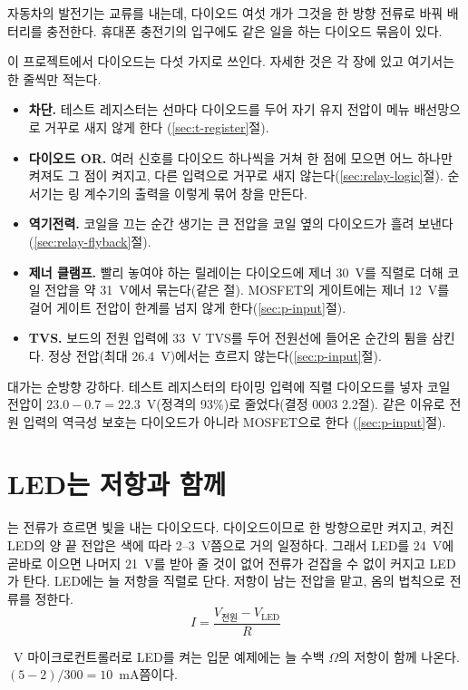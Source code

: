 \General 자동차의 발전기는 교류를 내는데, 다이오드 여섯 개가 그것을 한 방향 전류로 바꿔 배터리를 충전한다. 휴대폰
충전기의 입구에도 같은 일을 하는 다이오드 묶음이 있다.

\Ours 이 프로젝트에서 다이오드는 다섯 가지로 쓰인다. 자세한 것은 각 장에 있고 여기서는 한 줄씩만 적는다.
\begin{itemize}
\item \textbf{차단.} 테스트 레지스터는 선마다 다이오드를 두어 자기 유지 전압이 메뉴 배선망으로 거꾸로 새지 않게 한다
(\ref{sec:t-register}절).
\item \textbf{다이오드 OR.} 여러 신호를 다이오드 하나씩을 거쳐 한 점에 모으면 어느 하나만 켜져도 그 점이 켜지고,
다른 입력으로 거꾸로 새지 않는다(\ref{sec:relay-logic}절). 순서기는 링 계수기의 출력을 이렇게 묶어 창을 만든다.
\item \textbf{역기전력.} 코일을 끄는 순간 생기는 큰 전압을 코일 옆의 다이오드가 흘려 보낸다(\ref{sec:relay-flyback}절).
\item \textbf{제너 클램프.} 빨리 놓여야 하는 릴레이는 다이오드에 제너 30~V를 직렬로 더해 코일 전압을 약 31~V에서
묶는다(같은 절). MOSFET의 게이트에는 제너 12~V를 걸어 게이트 전압이 한계를 넘지 않게 한다(\ref{sec:p-input}절).
\item \textbf{TVS.} 보드의 전원 입력에 33~V TVS를 두어 전원선에 들어온 순간의 튐을 삼킨다. 정상 전압(최대 26.4~V)에서는
흐르지 않는다(\ref{sec:p-input}절).
\end{itemize}
대가는 순방향 강하다. 테스트 레지스터의 타이밍 입력에 직렬 다이오드를 넣자 코일 전압이 $23.0 - 0.7 = 22.3$~V(정격의
93\%)로 줄었다(결정 0003 2.2절). 같은 이유로 전원 입력의 역극성 보호는 다이오드가 아니라 MOSFET으로 한다
(\ref{sec:p-input}절).

\section{LED는 저항과 함께}\label{sec:el-led}

\Why {}는 전류가 흐르면 빛을 내는 다이오드다. 다이오드이므로 한 방향으로만 켜지고, 켜진
LED의 양 끝 전압은 색에 따라 2--3~V쯤으로 거의 일정하다. 그래서 LED를 24~V에 곧바로 이으면 나머지 21~V를 받아 줄
것이 없어 전류가 걷잡을 수 없이 커지고 LED가 탄다. LED에는 늘 저항을 직렬로 단다. 저항이 남는 전압을 맡고, 옴의
법칙으로 전류를 정한다.
\[
  I = \frac{V_{\text{전원}} - V_{\text{LED}}}{R}
\]

~V 마이크로컨트롤러로 LED를 켜는 입문 예제에는 늘 수백 $\Omega$의 저항이 함께 나온다. $(5 - 2)/300 = 10$~mA쯤이다.

